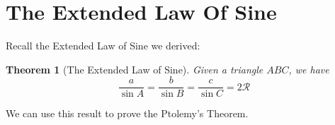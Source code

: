 \documentclass{article}
\newtheorem{theorem}{Theorem}[section]
\theoremstyle{definition}
\begin{document}
\section{The Extended Law Of Sine}

Recall the Extended Law of Sine we derived:

\begin{mdframed}
	\begin{theorem}[The Extended Law of Sine]
		Given a triangle $ABC$, we have 
		\begin{equation*}
			\frac{a}{\sin A} = \frac{b}{\sin B} = \frac{c}{\sin C} = 2\mathcal{R}
		\end{equation*}
	\end{theorem}
\end{mdframed}

We can use this result to prove the Ptolemy's Theorem.
\end{document}
